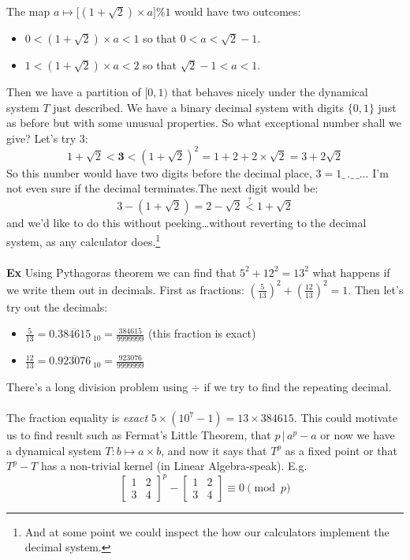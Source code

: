 \documentclass[12pt]{article}
\begin{document}
The map $a \mapsto \big[ (1 + \sqrt{2}) \times a \big] \% 1$ would have two outcomes:
\begin{itemize}
\item $0 < (1 + \sqrt{2}) \times a  < 1 $ so that $0 < a < \sqrt{2}-1$.
\item $1 < (1 + \sqrt{2}) \times a  < 2 $ so that $\sqrt{2}-1 < a < 1 $.
\end{itemize}
Then we have a partition of $[0,1)$ that behaves nicely under the dynamical system $T$ just described.  We have a binary decimal system with digits $\{ 0, 1\}$ just as before but with some unusual properties.  So what exceptional number shall we give?  Let's try $3$:
$$1  + \sqrt{2} < \mathbf{3} < (1 + \sqrt{2})^2 = 1 + 2 + 2 \times \sqrt{2} = 3 + 2 \sqrt{2} $$
So this number would have two digits before the decimal place, $3 = 1\_\,.\_\,\_\dots$
I'm not even sure if the decimal terminates.The next digit would be:
$$ 3 - (1 + \sqrt{2}) = 2 - \sqrt{2} \stackrel{?}{<} 1 + \sqrt{2} $$
and we'd like to do this without peeking\dots without reverting to the decimal system, as any calculator does.\footnote{And at some point we could inspect the how our calculators implement the decimal system.} \\ \\
\textbf{Ex}  Using Pythagoras theorem we can find that $5^2 + 12^2 = 13^2$ what happens if we write them out in decimals.  First as fractions: $(\frac{5}{13})^2 + (\frac{12}{13})^2 = 1$.  Then let's try out the decimals:
\begin{itemize}
\item $\frac{5}{13} = 0.\overline{384615}_{\;10} = \frac{384615}{9999999} $ (this fraction is exact)
\item $\frac{12}{13} = 0.\overline{923076}_{\;10} = \frac{923076}{9999999}$
\end{itemize}
There's a long division problem using $\div$ if we try to find the repeating decimal.  \\ \\
The fraction equality is \textit{exact} $5 \times (10^7 - 1) = 13 \times 384615$. This could motivate us to find result such as Fermat's Little Theorem, that $p \,\big|\, a^p - a $ or now we have a dynamical system $T: b \mapsto a \times b $, and now it says that $T^p$ as a fixed point or that $T^p - T$ has a non-trivial kernel (in Linear Algebra-speak). E.g. 
$$ 
\left[ \begin{array}{cc} 1 & 2 \\ 3 & 4 \end{array} \right]^p - 
\left[ \begin{array}{cc} 1 & 2 \\ 3 & 4 \end{array} \right] \equiv 0 \pmod p $$
\end{document}
